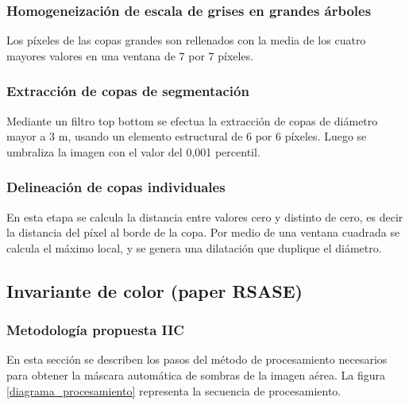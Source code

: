 \subsubsection{Homogeneización de escala de grises en grandes árboles}
Los píxeles de las copas grandes son rellenados con la media de los cuatro mayores valores en una ventana de 7 por 7 píxeles.
\subsubsection{Extracción de copas de segmentación}
Mediante un filtro top bottom se efectua la extracción de copas de diámetro mayor a 3 m, usando un elemento estructural de 6 por 6 píxeles. Luego se umbraliza la imagen con el valor del 0,001 percentil.
\subsubsection{Delineación de copas individuales}
En esta etapa se calcula la distancia entre valores cero y distinto de cero, es decir la distancia del píxel al borde de la copa. Por medio de una ventana cuadrada se calcula el máximo local, y se genera una dilatación que duplique el diámetro.





\color{cyan} %
\subsection{Invariante de color (paper RSASE)}
\subsubsection{Metodología propuesta IIC}
En esta sección se describen los pasos del método de procesamiento necesarios para obtener la máscara automática de sombras de la imagen aérea. La figura \ref{diagrama_procesamiento} representa la secuencia de procesamiento.

